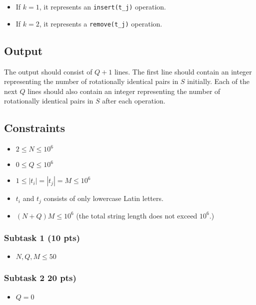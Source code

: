 \begin{itemize}
    \item If $k = 1$, it represents an \verb|insert(t_j)| operation.
    \item If $k = 2$, it represents a \verb|remove(t_j)| operation.
\end{itemize}

\subsection{Output}\label{output}

The output should consist of $Q+1$ lines. The first line should contain an integer representing the number of rotationally identical pairs in $S$ initially. Each of the next $Q$ lines should also contain an integer representing the number of rotationally identical pairs in $S$ after each operation. 

\subsection{Constraints} \label{constraint}
\begin{itemize}
\tightlist
    \item $2 \le N \le 10^6$
    \item $0 \le Q \le 10^6$
    \item $1 \le |t_i| = |t_j| = M \le 10^6$
    \item $t_i$ and $t_j$ consists of only lowercase Latin letters.
    \item $(N+Q)M \le 10^6$ (the total string length does not exceed $10^6$.)
\end{itemize}

\subsubsection{Subtask 1 (10 pts)}\label{subtask-1}

\begin{itemize}
\tightlist
\item $N, Q, M \le 50$
\end{itemize}

\subsubsection{Subtask 2 20 pts)}\label{subtask-2}

\begin{itemize}
\tightlist
\item $Q = 0$ 
\end{itemize}

